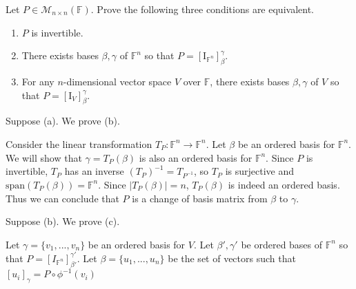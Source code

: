 \documentclass{eh-homework}
\begin{document}
    \begin{question}{8}
        Let \( P \in \mathcal{M}_{n \times n}(\mathbb{F}) \). Prove the following three conditions are equivalent.

        \begin{enumerate}[label=(\alph*)]
            \item \( P \) is invertible.
            \item There exists bases \( \beta, \gamma \) of \( \mathbb{F}^n \) so that \( P = [\mathrm{I}_{\mathbb{F}^n}]_\beta^\gamma \).
            \item For any \( n \)-dimensional vector space \( V \) over \( \mathbb{F} \), there exists bases \( \beta, \gamma \) of \( V \) so that \( P = [\mathrm{I}_V]_\beta^\gamma \).
        \end{enumerate}
        \tcblower

        Suppose (a). We prove (b).

        Consider the linear transformation \(T_P : \mathbb{F}^n \to \mathbb{F}^n\). Let \(\beta\) be an ordered basis for \(\mathbb{F}^n\). We will show that \(\gamma = T_P(\beta)\) is also an ordered basis for \(\mathbb{F}^n\). Since \(P\) is invertible, \(T_P\) has an inverse \((T_P)^{-1} = T_{P^{-1}}\), so \(T_P\) is surjective and \(\mathrm{span} (T_P(\beta)) = \mathbb{F}^n\). Since \(|T_P(\beta)| = n\), \(T_P(\beta)\) is indeed an ordered basis. Thus we can conclude that \(P\) is a change of basis matrix from \(\beta\) to \(\gamma\).

        \medskip

        Suppose (b). We prove (c).

        Let \(\gamma = \{ v_1, ..., v_n \}\) be an ordered basis for \(V\). Let \(\beta',\gamma'\) be ordered bases of \(\mathbb{F}^n\) so that \(P = [I_{\mathbb{F}^n}]_{\beta'}^{\gamma'}\). Let \(\beta = \{ u_1, ..., u_n \}\) be the set of vectors such that \([u_i]_\gamma = P \circ \phi^{-1} (v_i)\) 
    \end{question}
\end{document}
